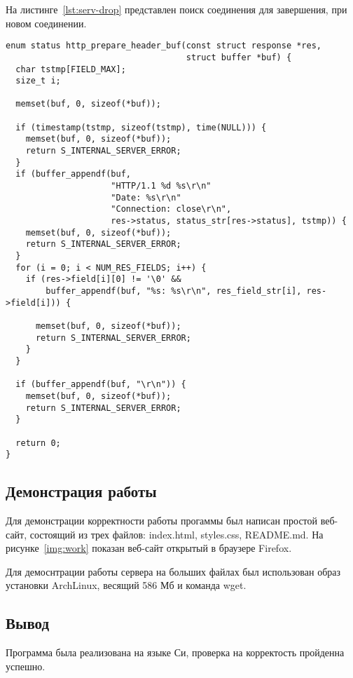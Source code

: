 На листинге~\ref{lst:serv-drop} представлен поиск соединения для завершения, при новом соединении.


\begin{center}
\captionsetup{justification=raggedright,singlelinecheck=off}
\begin{lstlisting}[label=lst:serv-drop,caption=Функция поиска соединения]
enum status http_prepare_header_buf(const struct response *res,
                                    struct buffer *buf) {
  char tstmp[FIELD_MAX];
  size_t i;

  memset(buf, 0, sizeof(*buf));

  if (timestamp(tstmp, sizeof(tstmp), time(NULL))) {
    memset(buf, 0, sizeof(*buf));
    return S_INTERNAL_SERVER_ERROR;
  }
  if (buffer_appendf(buf,
                     "HTTP/1.1 %d %s\r\n"
                     "Date: %s\r\n"
                     "Connection: close\r\n",
                     res->status, status_str[res->status], tstmp)) {
    memset(buf, 0, sizeof(*buf));
    return S_INTERNAL_SERVER_ERROR;
  }
  for (i = 0; i < NUM_RES_FIELDS; i++) {
    if (res->field[i][0] != '\0' &&
        buffer_appendf(buf, "%s: %s\r\n", res_field_str[i], res->field[i])) {

      memset(buf, 0, sizeof(*buf));
      return S_INTERNAL_SERVER_ERROR;
    }
  }

  if (buffer_appendf(buf, "\r\n")) {
    memset(buf, 0, sizeof(*buf));
    return S_INTERNAL_SERVER_ERROR;
  }

  return 0;
}
\end{lstlisting}
\end{center}

\subsection{Демонстрация работы}

Для демонстрации корректности работы прогаммы был написан простой веб-сайт, состоящий из трех файлов: index.html, styles.css, README.md. 
На рисунке~\ref{img:work} показан веб-сайт открытый в браузере Firefox.


Для демоснтрации работы сервера на больших файлах был использован образ установки ArchLinux, весящий 586 Мб и команда wget.


\subsection*{Вывод}

Программа была реализована на языке Си, проверка на корректость пройденна успешно.

